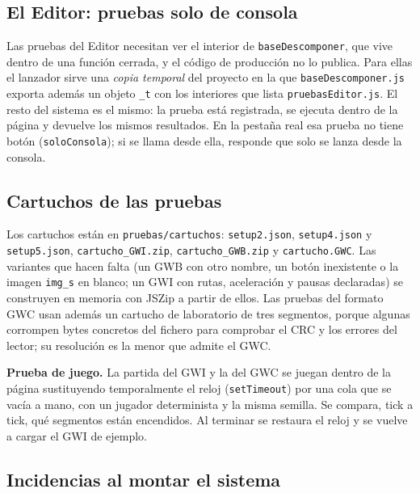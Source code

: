 \subsection{El Editor: pruebas solo de consola}
\label{sec:F5I18Editor}

Las pruebas del Editor necesitan ver el interior de \texttt{baseDescomponer}, que vive dentro de una función cerrada, y el código de producción no lo publica. Para ellas el lanzador sirve una \emph{copia temporal} del proyecto en la que \texttt{baseDescomponer.js} exporta además un objeto \texttt{\_t} con los interiores que lista \texttt{pruebasEditor.js}. El resto del sistema es el mismo: la prueba está registrada, se ejecuta dentro de la página y devuelve los mismos resultados. En la pestaña real esa prueba no tiene botón (\texttt{soloConsola}); si se llama desde ella, responde que solo se lanza desde la consola.

\subsection{Cartuchos de las pruebas}
\label{sec:F5I18Cartuchos}

Los cartuchos están en \texttt{pruebas/cartuchos}: \texttt{setup2.json}, \texttt{setup4.json} y \texttt{setup5.json}, \texttt{cartucho\_GWI.zip}, \texttt{cartucho\_GWB.zip} y \texttt{cartucho.GWC}. Las variantes que hacen falta (un GWB con otro nombre, un botón inexistente o la imagen \texttt{img\_s} en blanco; un GWI con rutas, aceleración y pausas declaradas) se construyen en memoria con JSZip a partir de ellos. Las pruebas del formato GWC usan además un cartucho de laboratorio de tres segmentos, porque algunas corrompen bytes concretos del fichero para comprobar el CRC y los errores del lector; su resolución es la menor que admite el GWC.

\textbf{Prueba de juego.} La partida del GWI y la del GWC se juegan dentro de la página sustituyendo temporalmente el reloj (\texttt{setTimeout}) por una cola que se vacía a mano, con un jugador determinista y la misma semilla. Se compara, tick a tick, qué segmentos están encendidos. Al terminar se restaura el reloj y se vuelve a cargar el GWI de ejemplo.

\subsection{Incidencias al montar el sistema}
\label{sec:F5I18Incidencias}

